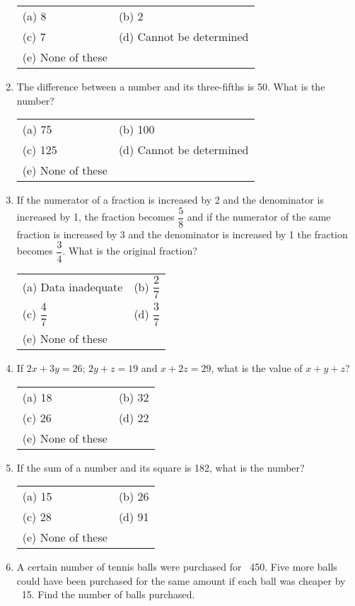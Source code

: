\begin{multicols}{2}
\begin{enumerate}[leftmargin=*]
\begin{tabular}{l@{\qquad\quad}l}
(a) 8 & (b) 2 \\
(c) 7 & (d) Cannot be determined \\
(e) None of these
\end{tabular}

\item The difference between a number and its three-fifths is 50. What is the number?

\begin{tabular}{l@{\qquad\quad}l}
(a) 75 & (b) 100 \\
(c) 125 & (d) Cannot be determined\\
(e) None of these
\end{tabular}

\item If the numerator of a fraction is increased by 2 and the denominator is increased by 1, the fraction becomes $\dfrac{5}{8}$ and if the numerator of the same fraction is increased by 3 and the denominator is increased by 1 the fraction becomes $\dfrac{3}{4}$. What is the original fraction?

\begin{tabular}{l@{\qquad\quad}l}
(a) Data inadequate & (b) $\dfrac{2}{7}$\\[0.3cm]
(c) $\dfrac{4}{7}$ & (d) $\dfrac{3}{7}$\\
(e) None of these
\end{tabular}

\item If $2x + 3y = 26$; $2y + z = 19$ and $x + 2z = 29$, what is the value of $x + y + z$?

\begin{tabular}{l@{\qquad\quad}l}
(a) 18 & (b) 32 \\
(c) 26 & (d) 22 \\
(e) None of these
\end{tabular}

\item If the sum of a number and its square is 182, what is the number?

\begin{tabular}{l@{\qquad\quad}l}
(a) 15 & (b) 26 \\
(c) 28 & (d) 91 \\
(e) None of these
\end{tabular}

\item A certain number of tennis balls were purchased for \rupee~450. Five more balls could have been purchased for the same amount if each ball was cheaper by \rupee~15. Find the number of balls purchased.


\end{enumerate}
\end{multicols}
